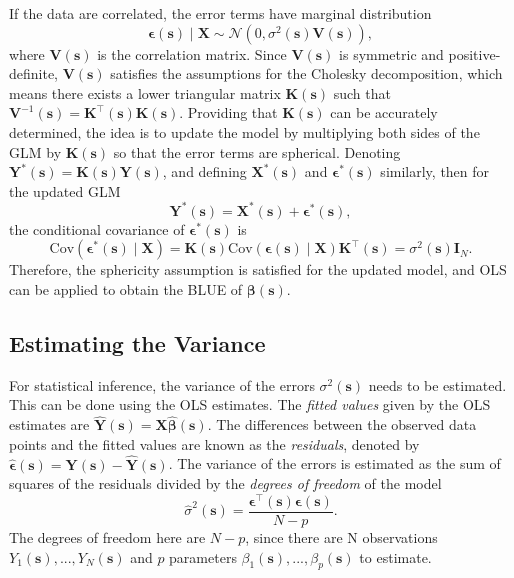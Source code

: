 If the data are correlated, the error terms have marginal distribution 
\begin{equation}
\label{eq:correlated_errors}
\bm{\epsilon}(\bm{s}) \mid \bm{X} \sim  \mathcal{N}(0, \sigma^{2}(\bm{s})\bm{V}(\bm{s})),
\end{equation}
where $\bm{V}(\bm{s})$ is the correlation matrix. Since $\bm{V}(\bm{s})$ is symmetric and positive-definite, $\bm{V}(\bm{s})$ satisfies the assumptions for the Cholesky decomposition, which means there exists a lower triangular matrix $\bm{K}(\bm{s})$ such that $\bm{V}^{-1}(\bm{s}) = \bm{K}^{\intercal}(\bm{s})\bm{K}(\bm{s})$. Providing that $\bm{K}(\bm{s})$ can be accurately determined, the idea is to update the model by multiplying both sides of the GLM by $\bm{K}(\bm{s})$ so that the error terms are spherical. Denoting $\bm{Y}^{*}(\bm{s}) = \bm{K}(\bm{s})\bm{Y}(\bm{s})$, and defining $\bm{X}^{*}(\bm{s})$ and $\bm{\epsilon}^{*}(\bm{s})$ similarly, then for the updated GLM
\begin{equation}
\label{eq:updated_GLM}
\bm{Y}^{*}(\bm{s}) = \bm{X}^{*}(\bm{s}) + \bm{\epsilon}^{*}(\bm{s}),
\end{equation}
the conditional covariance of $\bm{\epsilon}^{*}(\bm{s})$ is
\begin{equation}
\label{eq:updated_error_cov}
\mathrm{Cov}(\bm{\epsilon}^{*}(\bm{s}) \mid \bm{X}) = \bm{K}(\bm{s})\mathrm{Cov}(\bm{\epsilon}(\bm{s}) \mid \bm{X})\bm{K}^{\intercal}(\bm{s}) = \sigma^{2}(\bm{s})\bm{I}_{N}.
\end{equation}
Therefore, the sphericity assumption is satisfied for the updated model, and OLS can be applied to obtain the BLUE of $\bm{\beta}(\bm{s})$.

\subsection{Estimating the Variance}
For statistical inference, the variance of the errors $\sigma^{2}(\bm{s})$ needs to be estimated. This can be done using the OLS estimates. The \textit{fitted values} given by the OLS estimates are $\hat{\bm{Y}}(\bm{s}) = \bm{X}\hat{\bm{\beta}}(\bm{s})$. The differences between the observed data points and the fitted values are known as the \textit{residuals}, denoted by $\hat{\bm{\epsilon}}(\bm{s}) = \bm{Y}(\bm{s}) - \hat{\bm{Y}}(\bm{s})$. The variance of the errors is estimated as the sum of squares of the residuals divided by the \textit{degrees of freedom} of the model
\begin{equation}
\label{eq:variance_estimator}
\hat{\sigma}^{2}(\bm{s}) = \frac{\bm{\epsilon^{\intercal}}(\bm{s})\bm{\epsilon}(\bm{s})}{N - p}.
\end{equation}
The degrees of freedom here are $N - p$, since there are N observations $Y_{1}(\bm{s}), ..., Y_{N}(\bm{s})$ and $p$ parameters $\beta_{1}(\bm{s}), ... , \beta_{p}(\bm{s})$ to estimate.

